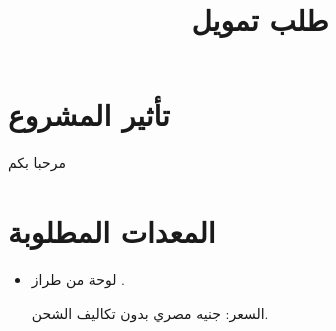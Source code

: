 \documentclass[arabic]{article}
\title{\Huge{طلب تمويل}}
\begin{document}
\maketitle

\section{تأثير المشروع}

مرحبا بكم

\section{المعدات المطلوبة}

\begin{itemize}
\item
لوحة
من طراز
.

السعر:
جنيه مصري بدون تكاليف الشحن.

\end{itemize}
\end{document}

